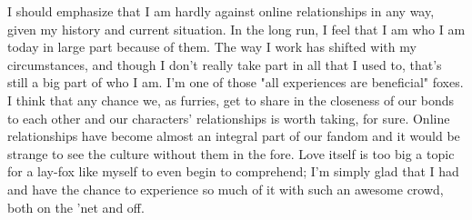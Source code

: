 I should emphasize that I am hardly against online relationships in any way, given my history and current situation. In the long run, I feel that I am who I am today in large part because of them. The way I work has shifted with my circumstances, and though I don't really take part in all that I used to, that's still a big part of who I am. I'm one of those "all experiences are beneficial" foxes. I think that any chance we, as furries, get to share in the closeness of our bonds to each other and our characters' relationships is worth taking, for sure. Online relationships have become almost an integral part of our fandom and it would be strange to see the culture without them in the fore. Love itself is too big a topic for a lay-fox like myself to even begin to comprehend; I'm simply glad that I had and have the chance to experience so much of it with such an awesome crowd, both on the 'net and off.
